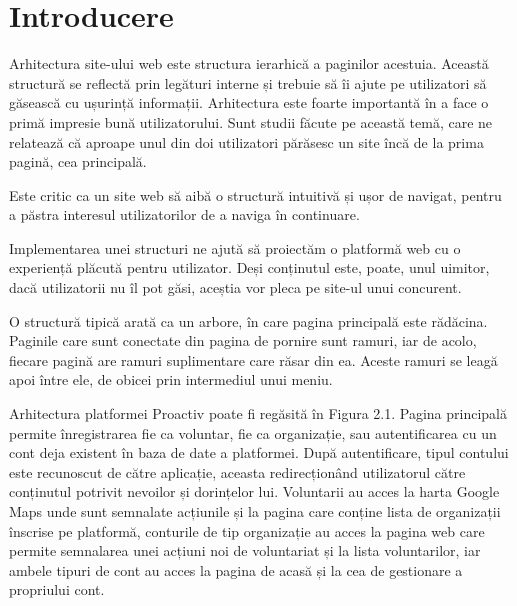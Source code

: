 \documentclass[12pt,a4paper]{report}
\begin{document}
\section{Introducere}
\par
Arhitectura site-ului web este structura ierarhică a paginilor acestuia. Această structură se reflectă prin legături interne și trebuie să îi ajute pe utilizatori să găsească cu ușurință informații. Arhitectura este foarte importantă în a face o primă impresie bună utilizatorului. Sunt studii făcute pe această temă, care ne relatează că aproape unul din doi utilizatori părăsesc un site încă de la prima pagină, cea principală.
\\\par 
Este critic ca un site web să aibă o structură intuitivă și ușor de navigat, pentru a păstra interesul utilizatorilor de a naviga în continuare.
\\\par 
Implementarea unei structuri ne ajută să proiectăm o platformă web cu o experiență plăcută pentru utilizator. Deși conținutul este, poate, unul uimitor, dacă utilizatorii nu îl pot găsi, aceștia vor pleca pe site-ul unui concurent.
\\\par 
O structură tipică arată ca un arbore, în care pagina principală este rădăcina. Paginile care sunt conectate din pagina de pornire sunt ramuri, iar de acolo, fiecare pagină are ramuri suplimentare care răsar din ea. Aceste ramuri se leagă apoi între ele, de obicei prin intermediul unui meniu.
\\\par 
Arhitectura platformei Proactiv poate fi regăsită în Figura 2.1. Pagina principală permite înregistrarea fie ca voluntar, fie ca organizație, sau autentificarea cu un cont deja existent în baza de date a platformei. După autentificare, tipul contului este recunoscut de către aplicație, aceasta redirecționând utilizatorul către conținutul potrivit nevoilor și dorințelor lui. Voluntarii au acces la harta Google Maps unde sunt semnalate acțiunile și la pagina care conține lista de organizații înscrise pe platformă, conturile de tip organizație au acces la pagina web care permite semnalarea unei acțiuni noi de voluntariat și la lista voluntarilor, iar ambele tipuri de cont au acces la pagina de acasă și la cea de gestionare a propriului cont.
\end{document}
